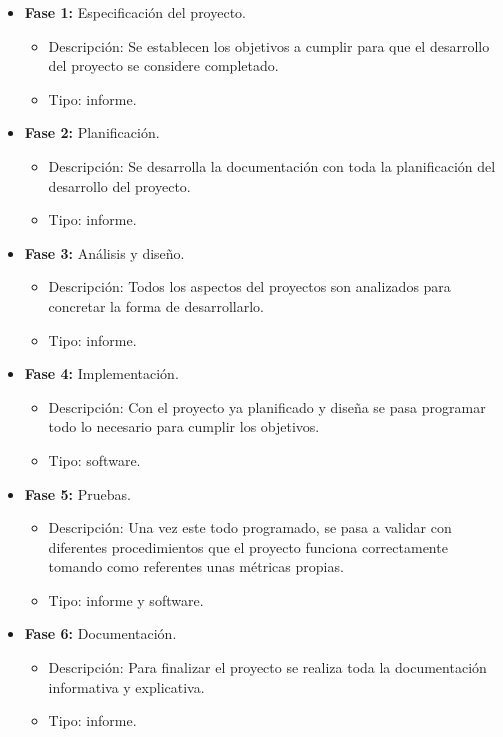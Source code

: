 \begin{itemize}
  \item \textbf{Fase 1:} Especificación del proyecto.
  \begin{itemize}
    \item Descripción: Se establecen los objetivos a cumplir para que el desarrollo del proyecto se considere completado.
    \item Tipo: informe.
  \end{itemize}
  \newpage
  \item \textbf{Fase 2:} Planificación.
  \begin{itemize}
    \item Descripción: Se desarrolla la documentación con toda la planificación del desarrollo del proyecto.
    \item Tipo: informe.
  \end{itemize}
  \item \textbf{Fase 3:} Análisis y diseño.
  \begin{itemize}
    \item Descripción: Todos los aspectos del proyectos son analizados para concretar la forma de desarrollarlo.
    \item Tipo: informe.
  \end{itemize}
  \item \textbf{Fase 4:} Implementación.
  \begin{itemize}
    \item Descripción: Con el proyecto ya planificado y diseña se pasa programar todo lo necesario para cumplir los objetivos.
    \item Tipo: software.
  \end{itemize}
  \item \textbf{Fase 5:} Pruebas.
  \begin{itemize}
    \item Descripción: Una vez este todo programado, se pasa a validar con diferentes procedimientos que el proyecto funciona correctamente tomando como referentes unas métricas propias.
    \item Tipo: informe y software.
  \end{itemize}
  \item \textbf{Fase 6:} Documentación.
  \begin{itemize}
    \item Descripción: Para finalizar el proyecto se realiza toda la documentación informativa y explicativa.
    \item Tipo: informe.
  \end{itemize}
\end{itemize}

